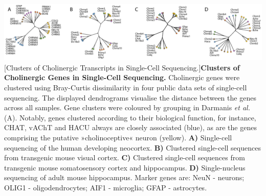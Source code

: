 \begin{minipage}{\linewidth}
\vspace{30pt}

\centering
\includegraphics[width=\textwidth]{figures/chol-clusters}
[Clusters of Cholinergic Transcripts in Single-Cell Sequencing.]{\textbf{Clusters of Cholinergic Genes in Single-Cell Sequencing.} Cholinergic genes were clustered using Bray-Curtis dissimilarity in four public data sets of single-cell sequencing. The displayed dendrograms visualise the distance between the genes across all samples. Gene clusters were coloured by grouping in Darmanis \emph{et al.}\cite{Darmanis2015} (A). Notably, genes clustered according to their biological function, for instance, CHAT, vAChT and HACU always are closely associated (blue), as are the genes comprising the putative »cholinoceptive« neuron (yellow). \textbf{A)} Single-cell sequencing of the human developing neocortex.\cite{Darmanis2015} \textbf{B)} Clustered single-cell sequences from transgenic mouse visual cortex.\cite{Tasic2016} \textbf{C)} Clustered single-cell sequences from transgenic mouse somatosensory cortex and hippocampus.\cite{Zeisel2015} \textbf{D)} Single-nucleus sequencing of adult mouse hippocampus.\cite{Habib2016} Marker genes are: NeuN - neurons; OLIG1 - oligodendrocytes; AIF1 - microglia; GFAP - astrocytes.
\label{fig:chol-clusters}}

\end{minipage}

\clearpage
